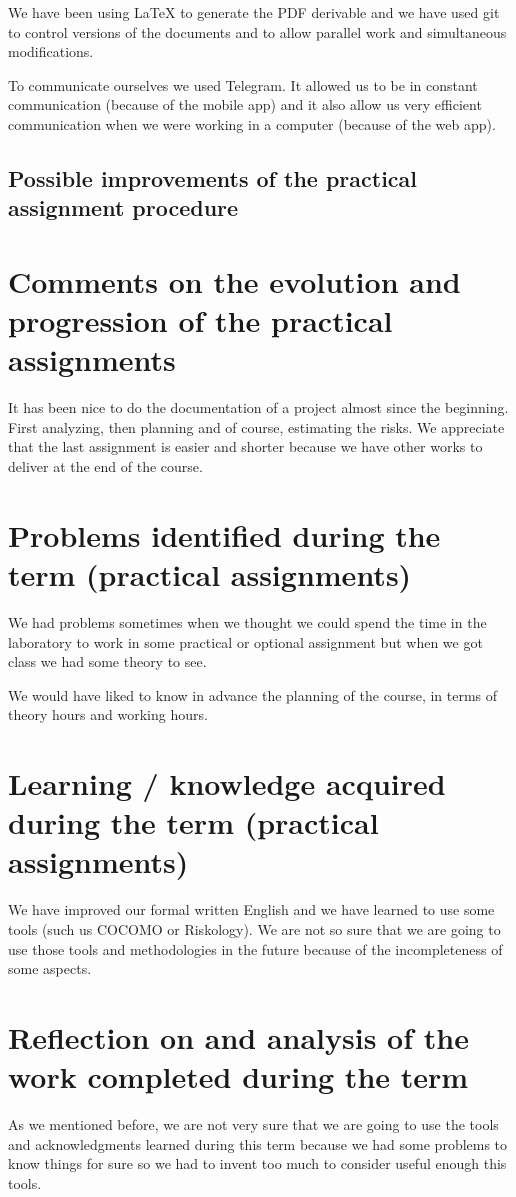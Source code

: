 \documentclass{report}
\begin{document}
We have been using LaTeX to generate the PDF derivable and we have used git to control versions of the documents and to allow parallel work and simultaneous modifications.

To communicate ourselves we used Telegram. It allowed us to be in constant communication (because of the mobile app) and it also allow us very efficient communication when we were working in a computer (because of the web app).

\subsection{Possible improvements of the practical assignment procedure}



\section{Comments on the evolution and progression of the practical assignments}
It has been nice to do the documentation of a project almost since the beginning. First analyzing, then planning and of course, estimating the risks. We appreciate that the last assignment is easier and shorter because we have other works to deliver at the end of the course. 

\section{Problems identified during the term (practical assignments)}
We had problems sometimes when we thought we could spend the time in the laboratory to work in some practical or optional assignment but when we got class we had some theory to see. 

We would have liked to know in advance the planning of the course, in terms of theory hours and working hours.

\section{Learning / knowledge acquired during the term (practical assignments)}

We have improved our formal written English and we have learned to use some tools (such us COCOMO or Riskology). We are not so sure that we are going to use those tools and methodologies in the future because of the incompleteness of some aspects.

\section{Reflection on and analysis of the work completed during the term}
As we mentioned before, we are not very sure that we are going to use the tools and acknowledgments learned during this term because we had some problems to know things for sure so we had to invent too much to consider useful enough this tools. 
\end{document}
